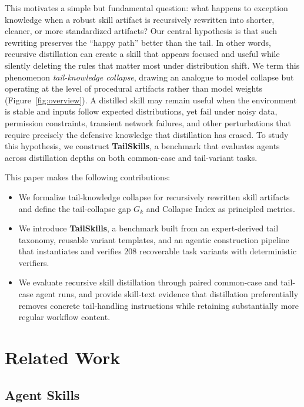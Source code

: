 \documentclass[11pt]{article}
\begin{document}
This motivates a simple but fundamental question: what happens to exception knowledge when a robust skill artifact is recursively rewritten into shorter, cleaner, or more standardized artifacts? Our central hypothesis is that such rewriting preserves the ``happy path'' better than the tail. In other words, recursive distillation can create a skill that appears focused and useful while silently deleting the rules that matter most under distribution shift. We term this phenomenon \textit{tail-knowledge collapse}, drawing an analogue to model collapse \citep{shumailov2024modelcollapse} but operating at the level of procedural artifacts rather than model weights (Figure~\ref{fig:overview}). A distilled skill may remain useful when the environment is stable and inputs follow expected distributions, yet fail under noisy data, permission constraints, transient network failures, and other perturbations that require precisely the defensive knowledge that distillation has erased. To study this hypothesis, we construct \textbf{TailSkills}, a benchmark that evaluates agents across distillation depths on both common-case and tail-variant tasks.



This paper makes the following contributions:
\begin{itemize}
\item We formalize tail-knowledge collapse for recursively rewritten skill artifacts and define the tail-collapse gap $G_k$ and Collapse Index as principled metrics.
\item We introduce \textbf{TailSkills}, a benchmark built from an expert-derived tail taxonomy, reusable variant templates, and an agentic construction pipeline that instantiates and verifies 208 recoverable task variants with deterministic verifiers.
\item We evaluate recursive skill distillation through paired common-case and tail-case agent runs, and provide skill-text evidence that distillation preferentially removes concrete tail-handling instructions while retaining substantially more regular workflow content.
\end{itemize}

\section{Related Work}

\subsection{Agent Skills}
\end{document}
